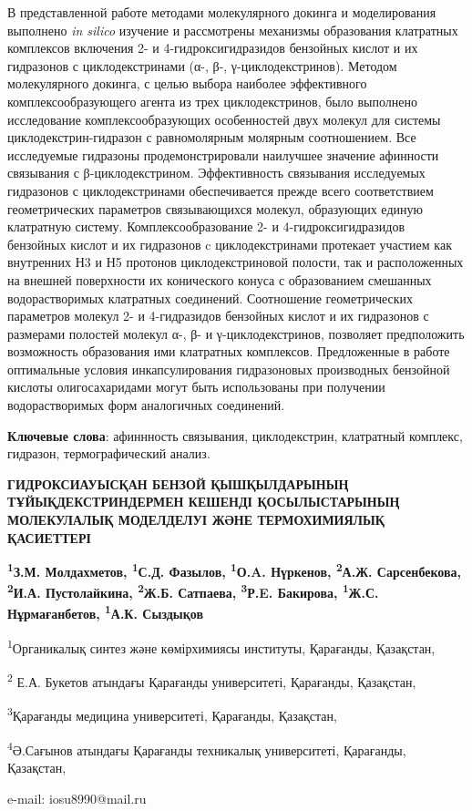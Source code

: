В представленной работе методами молекулярного докинга и моделирования
выполнено \emph{in silico} изучение и рассмотрены механизмы образования
клатратных комплексов включения 2- и 4-гидрок\-сигидразидов бензойных
кислот и их гидразонов с циклодекстринами (α-, β-, γ-циклодекстринов).
Методом молекулярного докинга, с целью выбора наиболее эффективного
комплексообразующего агента из трех циклодекстринов, было выполнено
исследование комплексообразующих особенностей двух молекул для системы
циклодекстрин-гидразон с равномолярным молярным соотношением. Все
исследуемые гидразоны продемонстрировали наилучшее значение афинности
связывания с β-циклодекстрином. Эффективность связывания исследуемых
гидразонов с циклодекстринами обеспечивается прежде всего соответствием
геометрических параметров связывающихся молекул, образующих единую
клатратную систему. Комплексообразование 2- и 4-гидроксигидразидов
бензойных кислот и их гидразонов c циклодекстринами протекает участием
как внутренних Н3 и Н5 протонов циклодекстриновой полости, так и
расположенных на внешней поверхности их конического конуса с
образованием смешанных водорастворимых клатратных соединений.
Соотношение геометрических параметров молекул 2- и 4-гидразидов
бензойных кислот и их гидразонов с размерами полостей молекул α-, β- и
γ-циклодекстринов, позволяет предположить возможность образования ими
клатратных комплексов. Предложенные в работе оптимальные условия
инкапсулирования гидразоновых производных бензойной кислоты
олигосахаридами могут быть использованы при получении водорастворимых
форм аналогичных соединений.

{\bfseries Ключевые слова}: афиннность связывания, циклодекстрин,
клатратный комплекс, гидразон, термографический анализ.

\begin{articleheader}
{\bfseries ГИДРОКСИАУЫСҚАН БЕНЗОЙ ҚЫШҚЫЛДАРЫНЫҢ ТҰЙЫҚДЕКСТРИНДЕРМЕН КЕШЕНДІ ҚОСЫЛЫСТАРЫНЫҢ МОЛЕКУЛАЛЫҚ МОДЕЛДЕЛУІ ЖӘНЕ ТЕРМОХИМИЯЛЫҚ ҚАСИЕТТЕРІ}

{\bfseries
\textsuperscript{1}З.М. Молдахметов,
\textsuperscript{1}С.Д. Фазылов\textsuperscript{\envelope },
\textsuperscript{1}О.A. Нүркенов,
\textsuperscript{2}А.Ж. Сарсенбекова,
\textsuperscript{2}И.А. Пустолайкина,
\textsuperscript{2}Ж.Б. Сатпаева,
\textsuperscript{3}Р.E. Бакирова,
\textsuperscript{1}Ж.С. Нұрмағанбетов,
\textsuperscript{1}А.К. Сыздықов
}
\end{articleheader}

\begin{affiliation}
\textsuperscript{1}Органикалық синтез және көмірхимиясы институты, Қарағанды, Қазақстан,

\textsuperscript{2} Е.А. Букетов атындағы Қарағанды университеті, Қарағанды, Қазақстан,

\textsuperscript{3}Қарағанды медицина университеті, Қарағанды, Қазақстан,

\textsuperscript{4}Ә.Сағынов атындағы Қарағанды техникалық университеті, Қарағанды, Қазақстан,

e-mail: iosu8990@mail.ru
\end{affiliation}

